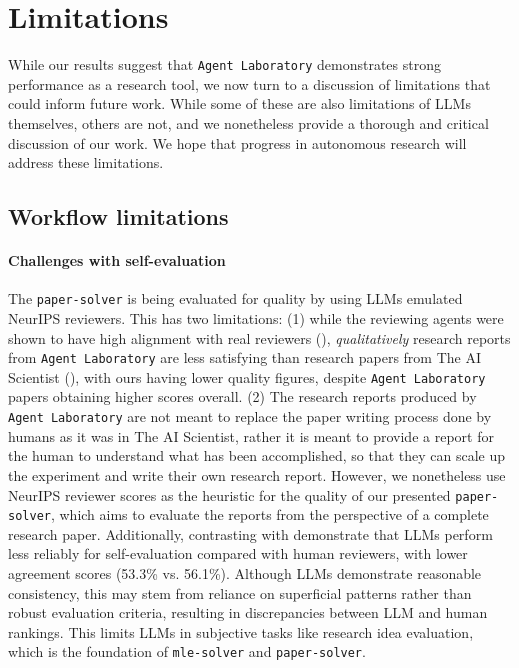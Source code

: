 \documentclass[11pt, a4paper]{gdm_format}
\begin{document}
\section{Limitations}
\label{sec:limitations}

While our results suggest that \texttt{Agent Laboratory} demonstrates strong performance as a research tool, we now turn to a discussion of limitations that could inform future work. While some of these are also limitations of LLMs themselves, others are not, and we nonetheless provide a thorough and critical discussion of our work. We hope that progress in autonomous research will address these limitations.

\subsection{Workflow limitations}
\label{sec:initlim}

\paragraph{Challenges with self-evaluation} The \texttt{paper-solver} is being evaluated for quality by using LLMs emulated NeurIPS reviewers. This has two limitations: (1) while the reviewing agents were shown to have high alignment with real reviewers (\cite{lu2024aiscientist}), \textit{qualitatively} research reports from \texttt{Agent Laboratory} are less satisfying than research papers from The AI Scientist (\cite{lu2024aiscientist}), with ours having lower quality figures, despite \texttt{Agent Laboratory} papers obtaining higher scores overall. (2) The research reports produced by \texttt{Agent Laboratory} are not meant to replace the paper writing process done by humans as it was in The AI Scientist, rather it is meant to provide a report for the human to understand what has been accomplished, so that they can scale up the experiment and write their own research report. However, we nonetheless use NeurIPS reviewer scores as the heuristic for the quality of our presented \texttt{paper-solver}, which aims to evaluate the reports from the perspective of a complete research paper. Additionally, contrasting with \cite{lu2024aiscientist} demonstrate that LLMs perform less reliably for self-evaluation compared with human reviewers, with lower agreement scores (53.3\% vs. 56.1\%). Although LLMs demonstrate reasonable consistency, this may stem from reliance on superficial patterns rather than robust evaluation criteria, resulting in discrepancies between LLM and human rankings. This limits LLMs in subjective tasks like research idea evaluation, which is the foundation of \texttt{mle-solver} and \texttt{paper-solver}.
\end{document}
